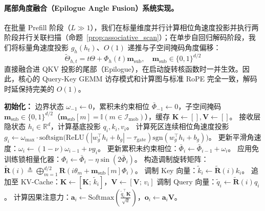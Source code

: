 \documentclass[11pt,a4paper]{article}
\theoremstyle{definition}
\begin{document}
\paragraph{尾部角度融合（Epilogue Angle Fusion）系统实现。}
在批量 Prefill 阶段（$L \gg 1$），我们在标量维度并行计算相位角速度投影并执行两阶段并行关联扫描（命题~\ref{prop:associative_scan}）；在单步自回归解码阶段，我们将标量角速度投影 $g_h(h_t)$、$O(1)$ 递推与子空间掩码角度偏移：
\begin{equation}
\tilde{\Theta}_{h,t} = t\Theta + \Phi_h(t)\mathbf{m}_{\text{sub}}, \quad \mathbf{m}_{\text{sub}} \in \{0, 1\}^{d/2}
\end{equation}
直接融合进 QKV 投影的尾部（Epilogue），在启动旋转核函数时一并生效。因此，核心的 Query-Key GEMM 访存模式和计算图与标准 RoPE 完全一致，解码时延保持完美的 $O(1)$。

\begin{algorithm}[htbp]
\caption{带有子空间反相 KV-Cache 的自回归生成算法}
\label{alg:kv_decoding}
\begin{algorithmic}[1]
\STATE \textbf{初始化：} 边界状态 $\omega_{-1} \gets 0$，累积未约束相位 $\bar{\Phi}_{-1} \gets 0$，子空间掩码 $\mathbf{m}_{\text{sub}} \in \{0, 1\}^{d/2}$（$\mathbf{m}_{\text{sub}}[m] = \mathbb{I}(m \in \mathcal{I}_{\text{mob}})$），缓存 $\mathbf{K} \gets [], \mathbf{V} \gets []$。
     \STATE 接收层隐状态 $h_i \in \mathbb{R}^d$，计算基底投影 $q_i, k_i, v_i$。
     \STATE 计算死区连续相位角速度投影 $g_i \gets \omega_{\max} \cdot \mathrm{softsign}\big(\mathrm{ReLU}(|w_g^\top h_i + b_g| - \tau_{\text{gate}})\mathrm{sgn}(w_g^\top h_i + b_g)\big)$。
     \STATE 更新平滑角速度：$\omega_i \gets (1 - \nu)\omega_{i-1} + \nu g_i$。
     \STATE 更新累积未约束相位：$\bar{\Phi}_i \gets \bar{\Phi}_{i-1} + \omega_i$。
     \STATE 应用免训练锁相量化器：$\Phi_i \gets \bar{\Phi}_i - \eta \sin(2\bar{\Phi}_i)$。
     \STATE 构造调制旋转矩阵：$\tilde{\mathbf{R}}(i) \triangleq \bigoplus_{m=1}^{d/2} \mathbf{R}(i\theta_m + \mathbf{m}_{\text{sub}}[m]\Phi_i)$。
     \STATE 调制 Key 向量：$\tilde{k}_i \gets \tilde{\mathbf{R}}(i) k_i$。
     \STATE 追加至 KV-Cache：$\mathbf{K} \gets [\mathbf{K}; \, \tilde{k}_i]$，$\mathbf{V} \gets [\mathbf{V}; \, v_i]$ 
     \STATE 调制 Query 向量：$\tilde{q}_i \gets \tilde{\mathbf{R}}(i) q_i$。
     \STATE 计算因果注意力：$\mathbf{a}_i \gets \mathrm{Softmax}\left( \frac{\tilde{q}_i^\top \mathbf{K}}{\sqrt{d}} \right)$，$\mathbf{o}_i \gets \mathbf{a}_i \mathbf{V}$。
\ENDFOR
\end{algorithmic}
\end{algorithm}
\end{document}
